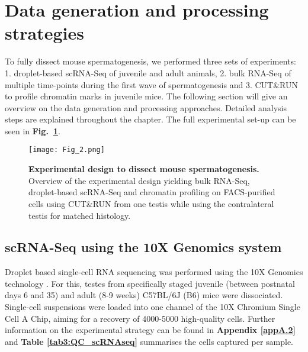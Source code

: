 
\section{Data generation and processing strategies}

To fully dissect mouse spermatogenesis, we performed three sets of experiments: 1. droplet-based scRNA-Seq of juvenile and adult animals, 2. bulk RNA-Seq of multiple time-points during the first wave of spermatogenesis and 3. CUT\&{}RUN to profile chromatin marks in juvenile mice. The following section will give an overview on the data generation and processing approaches. Detailed analysis steps are explained throughout the chapter. The full experimental set-up can be seen in \textbf{Fig.~\ref{fig3:experimental_design}}.

\begin{figure}[!h]
\centering
\texttt{[image: Fig\_2.png]}
\caption[Experimental design to dissect mouse spermatogenesis]{\textbf{Experimental design to dissect mouse spermatogenesis.}\\
Overview of the experimental design yielding bulk RNA-Seq, droplet-based scRNA-Seq and chromatin profiling on FACS-purified cells using CUT\&{}RUN from one testis while using the contralateral testis for matched histology.}
\label{fig3:experimental_design}
\end{figure}

\subsection{scRNA-Seq using the 10X Genomics\texttrademark{} system}

Droplet based single-cell RNA sequencing was performed using the 10X Genomics\texttrademark{} technology \citep{Zheng2017}. For this, testes from specifically staged juvenile (between postnatal days 6 and 35) and adult (8-9 weeks) C57BL/6J (B6) mice were dissociated. Single-cell suspensions were loaded into one channel of the 10X Chromium\texttrademark{} Single Cell A Chip, aiming for a recovery of 4000-5000 high-quality cells. Further information on the experimental strategy can be found in \textbf{Appendix \ref{appA.2}} and \textbf{Table \ref{tab3:QC_scRNAseq}} summarises the cells captured per sample.

\newpage

